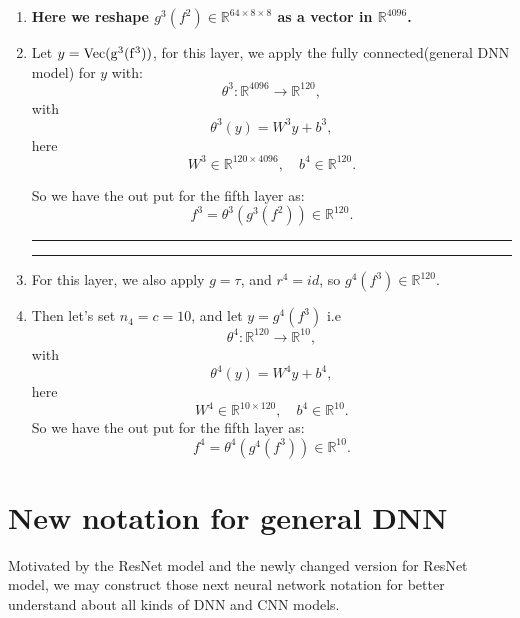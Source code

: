\begin{enumerate}
	\item {\bf Here we reshape $g^3(f^2) \in \mathbb R^{64 \times 8 \times 8}$ as a vector in $\mathbb{R}^{4096}$.}
	
	\item Let $y = \rm{Vec}(g^3(f^3))$, for this layer, we apply the fully connected(general DNN model) for $y$ with:
	\begin{equation}
	\theta^3: \mathbb{R}^{4096} \to \mathbb R^{120},
	\end{equation}
	with 
	\begin{equation}
	\theta^3(y) = W^3 y + b^3,
	\end{equation}
	here 
	\begin{equation}
	W^3 \in \mathbb{R}^{120\times 4096}, \quad b^4 \in \mathbb{R}^{120}.
	\end{equation}
	
	So we have the out put for the fifth layer as:
	\begin{equation}
	f^3 = \theta^3(g^3(f^2)) \in \mathbb{R}^{120}.
	\end{equation}
	
	\bigskip \hrule \bigskip  
	\bigskip \hrule \bigskip
	\item For this layer, we also apply $g = \tau$, and $r^4 = id$, so $g^{4}(f^3) \in \mathbb{R}^{120}$.
	
	\item Then let's set $n_4 = c =  10$, and let $y = g^4(f^3)$  i.e 
	\begin{equation}
	\theta^4: \mathbb{R}^{120} \to \mathbb R^{10},
	\end{equation}
	with 
	\begin{equation}
	\theta^4(y) = W^4 y + b^4,
	\end{equation}
	here 
	\begin{equation}
	W^4 \in \mathbb{R}^{10\times 120}, \quad b^4 \in \mathbb{R}^{10}.
	\end{equation}
	So we have the out put for the fifth layer as:
	\begin{equation}
	f^4 = \theta^4(g^4(f^3)) \in \mathbb{R}^{10}.
	\end{equation}
\end{enumerate}


\section{New notation for general DNN}
Motivated by the ResNet model and the newly changed version for ResNet model, we may construct those next neural network notation for better understand about all kinds of DNN and CNN models.


